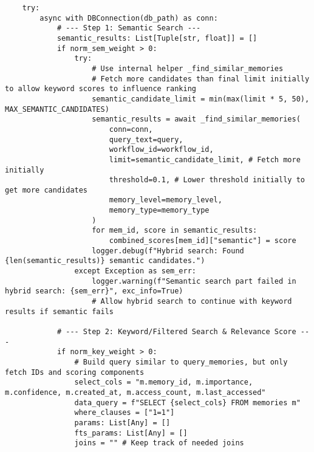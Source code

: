 \documentclass[12pt,a4paper]{article}
\begin{document}
\begin{pageablecode}
\begin{verbatim}
    try:
        async with DBConnection(db_path) as conn:
            # --- Step 1: Semantic Search ---
            semantic_results: List[Tuple[str, float]] = []
            if norm_sem_weight > 0:
                try:
                    # Use internal helper _find_similar_memories
                    # Fetch more candidates than final limit initially to allow keyword scores to influence ranking
                    semantic_candidate_limit = min(max(limit * 5, 50), MAX_SEMANTIC_CANDIDATES)
                    semantic_results = await _find_similar_memories(
                        conn=conn,
                        query_text=query,
                        workflow_id=workflow_id,
                        limit=semantic_candidate_limit, # Fetch more initially
                        threshold=0.1, # Lower threshold initially to get more candidates
                        memory_level=memory_level,
                        memory_type=memory_type
                    )
                    for mem_id, score in semantic_results:
                        combined_scores[mem_id]["semantic"] = score
                    logger.debug(f"Hybrid search: Found {len(semantic_results)} semantic candidates.")
                except Exception as sem_err:
                    logger.warning(f"Semantic search part failed in hybrid search: {sem_err}", exc_info=True)
                    # Allow hybrid search to continue with keyword results if semantic fails

            # --- Step 2: Keyword/Filtered Search & Relevance Score ---
            if norm_key_weight > 0:
                # Build query similar to query_memories, but only fetch IDs and scoring components
                select_cols = "m.memory_id, m.importance, m.confidence, m.created_at, m.access_count, m.last_accessed"
                data_query = f"SELECT {select_cols} FROM memories m"
                where_clauses = ["1=1"]
                params: List[Any] = []
                fts_params: List[Any] = []
                joins = "" # Keep track of needed joins


\end{verbatim}
\end{pageablecode}
\end{document}
